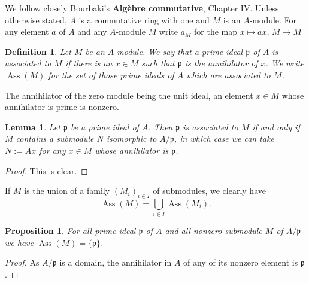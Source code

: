 \documentclass[parskip=half,fontsize=12pt]{scrartcl}%
\newcommand{\oo}{\operatorname}\newcommand{\ooo}{\operatorname*}
\newcommand{\mf}{\mathfrak}
\newcommand{\ppp}{\mf p}
\newcommand{\Ass}{\oo{Ass}}
\newtheorem{df}[thm]{Definition}
\newtheorem{lem}[thm]{Lemma}
\newtheorem{prop}[thm]{Proposition}
\begin{document}

We follow closely Bourbaki's \textbf{Algèbre commutative}, Chapter IV. Unless otherwise stated, $A$ is a commutative ring with one and $M$ is an $A$-module. For any element $a$ of $A$ and any $A$-module $M$ write $a_M$ for the map $x\mapsto ax$, $M\to M$


\begin{df}
Let $M$ be an $A$-module. We say that a prime ideal $\ppp$ of $A$ is \emph{associated} to $M$ if there is an $x\in M$ such that  $\ppp$ is the annihilator of $x$. We write $\Ass(M)$ for the set of those prime ideals of $A$ which are associated to $M$. 
\end{df}

The annihilator of the zero module being the unit ideal, an element $x\in M$ whose annihilator is prime is nonzero. 

\begin{lem}\label{ail0}
Let $\ppp$ be a prime ideal of $A$. Then $\ppp$ is associated to $M$ if and only if $M$ contains a submodule $N$ isomorphic to $A/\ppp$, in which case we can take $N:=Ax$ for any $x\in M$ whose annihilator is $\ppp$. 
\end{lem}
\begin{proof}
This is clear.
\end{proof}

If $M$ is the union of a family $(M_i)_{i\in I}$ of submodules, we clearly have
\begin{equation}\label{ai1}
\Ass(M)=\bigcup_{i\in I}\Ass(M_i).
\end{equation}

\begin{prop}\label{aip1}
For all prime ideal $\ppp$ of $A$ and all nonzero submodule $M$ of $A/\ppp$ we have $\Ass(M)=\{\ppp\}$. 
\end{prop}
\begin{proof}
As $A/\ppp$ is a domain, the annihilator in $A$ of any of its nonzero element is $\ppp$.
\end{proof}
\end{document}
